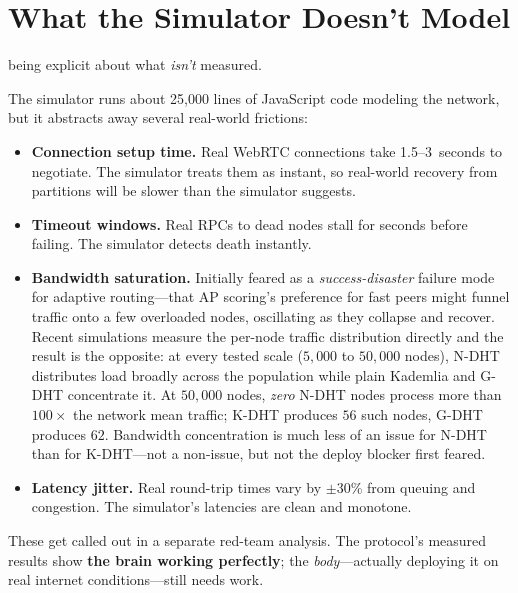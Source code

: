 \documentclass[nobib]{tufte-handout}
\begin{document}
\section{What the Simulator Doesn't Model}

 being explicit about what \emph{isn't} measured.

The simulator runs about 25{,}000 lines of JavaScript code modeling the network, but it abstracts away several real-world frictions:

\begin{itemize}
  \item \textbf{Connection setup time.} Real WebRTC connections take 1.5--3~seconds to negotiate. The simulator treats them as instant, so real-world recovery from partitions will be slower than the simulator suggests.
  \item \textbf{Timeout windows.} Real RPCs to dead nodes stall for seconds before failing. The simulator detects death instantly.
  \item \textbf{Bandwidth saturation.} Initially feared as a \emph{success-disaster} failure mode for adaptive routing---that AP scoring's preference for fast peers might funnel traffic onto a few overloaded nodes, oscillating as they collapse and recover. Recent simulations measure the per-node traffic distribution directly and the result is the opposite: at every tested scale ($5{,}000$ to $50{,}000$ nodes), N-DHT distributes load broadly across the population while plain Kademlia and G-DHT concentrate it. At $50{,}000$ nodes, \emph{zero} N-DHT nodes process more than $100\times$ the network mean traffic; K-DHT produces $56$ such nodes, G-DHT produces $62$. Bandwidth concentration is much less of an issue for N-DHT than for K-DHT---not a non-issue, but not the deploy blocker first feared.
  \item \textbf{Latency jitter.} Real round-trip times vary by $\pm$30\% from queuing and congestion. The simulator's latencies are clean and monotone.
\end{itemize}

These get called out in a separate red-team analysis. The protocol's measured results show \textbf{the brain working perfectly}; the \emph{body}---actually deploying it on real internet conditions---still needs work.
\end{document}
